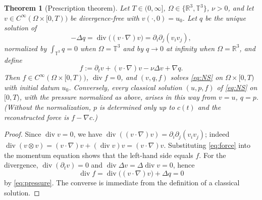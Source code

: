 \documentclass[11pt]{article}
\newtheorem{theorem}{Theorem}[section]
\theoremstyle{remark}
\newcommand{\R}{\mathbb{R}}
\newcommand{\T}{\mathbb{T}}
\newcommand{\Div}{\operatorname{div}}
\begin{document}
\begin{theorem}[Prescription theorem]\label{thm:prescription}
Let $T\in(0,\infty]$, $\Omega\in\{\R^3,\T^3\}$, $\nu>0$, and let
$v\in C^\infty(\Omega\times[0,T))$ be divergence-free with $v(\cdot,0)=u_0$. Let $q$ be the
unique solution of
\begin{equation}\label{eq:pressure}
-\Delta q=\Div\bigl((v\cdot\nabla)v\bigr)=\partial_i\partial_j(v_iv_j),
\end{equation}
normalized by $\int_{\T^3}q=0$ when $\Omega=\T^3$ and by $q\to0$ at infinity when
$\Omega=\R^3$, and define
\begin{equation}\label{eq:force}
f:=\partial_tv+(v\cdot\nabla)v-\nu\Delta v+\nabla q .
\end{equation}
Then $f\in C^\infty(\Omega\times[0,T))$, $\Div f=0$, and $(v,q,f)$ solves \eqref{eq:NS} on
$\Omega\times[0,T)$ with initial datum $u_0$. Conversely, every classical solution
$(u,p,f)$ of \eqref{eq:NS} on $[0,T)$, with the pressure normalized as above, arises in this
way from $v=u$, $q=p$. (Without the normalization, $p$ is determined only up to $c(t)$ and
the reconstructed force is $f-\nabla c$.)
\end{theorem}

\begin{proof}
Since $\Div v=0$, we have $\Div((v\cdot\nabla)v)=\partial_i\partial_j(v_iv_j)$; indeed
$\Div(v\otimes v)=(v\cdot\nabla)v+(\Div v)v=(v\cdot\nabla)v$. Substituting
\eqref{eq:force} into the momentum equation shows that the left-hand side equals $f$. For the
divergence, $\Div(\partial_tv)=0$ and $\Div\Delta v=\Delta\Div v=0$, hence
\[
\Div f=\Div\bigl((v\cdot\nabla)v\bigr)+\Delta q=0
\]
by \eqref{eq:pressure}. The converse is immediate from the definition of a classical
solution.
\end{proof}
\end{document}
